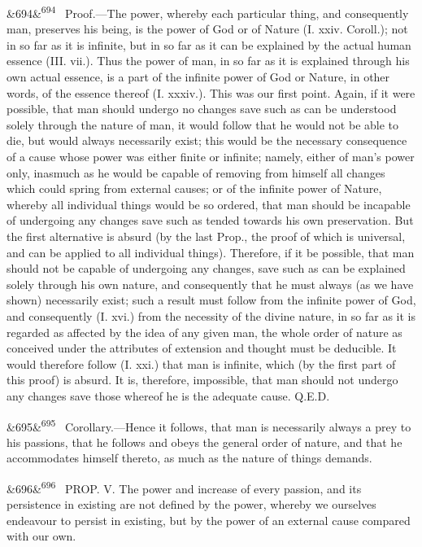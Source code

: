 \documentclass[12pt]{article}
\newcommand{\para}[1][]{\par\noindent\ifx&#1&\else\textsuperscript{\footnotesize #1}~\fi}
\begin{document}
\para[694] Proof.---The power, whereby each particular thing, and consequently man, preserves his being, is the power of God or of Nature (I. xxiv. Coroll.); not in so far as it is infinite, but in so far as it can be explained by the actual human essence (III. vii.). Thus the power of man, in so far as it is explained through his own actual essence, is a part of the infinite power of God or Nature, in other words, of the essence thereof (I. xxxiv.). This was our first point. Again, if it were possible, that man should undergo no changes save such as can be understood solely through the nature of man, it would follow that he would not be able to die, but would always necessarily exist; this would be the necessary consequence of a cause whose power was either finite or infinite; namely, either of man's power only, inasmuch as he would be capable of removing from himself all changes which could spring from external causes; or of the infinite power of Nature, whereby all individual things would be so ordered, that man should be incapable of undergoing any changes save such as tended towards his own preservation. But the first alternative is absurd (by the last Prop., the proof of which is universal, and can be applied to all individual things). Therefore, if it be possible, that man should not be capable of undergoing any changes, save such as can be explained solely through his own nature, and consequently that he must always (as we have shown) necessarily exist; such a result must follow from the infinite power of God, and consequently (I. xvi.) from the necessity of the divine nature, in so far as it is regarded as affected by the idea of any given man, the whole order of nature as conceived under the attributes of extension and thought must be deducible. It would therefore follow (I. xxi.) that man is infinite, which (by the first part of this proof) is absurd. It is, therefore, impossible, that man should not undergo any changes save those whereof he is the adequate cause. Q.E.D.

\para[695] Corollary.---Hence it follows, that man is necessarily always a prey to his passions, that he follows and obeys the general order of nature, and that he accommodates himself thereto, as much as the nature of things demands.

\para[696] PROP. V. The power and increase of every passion, and its persistence in existing are not defined by the power, whereby we ourselves endeavour to persist in existing, but by the power of an external cause compared with our own.
\end{document}
